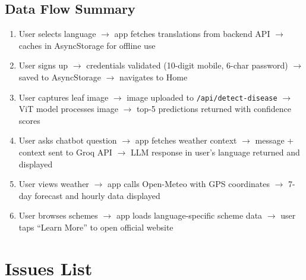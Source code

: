 \documentclass[12pt,a4paper]{article}
\begin{document}
\subsection{Data Flow Summary}
\begin{enumerate}
    \item User selects language $\rightarrow$ app fetches translations from backend API $\rightarrow$ caches in AsyncStorage for offline use
    \item User signs up $\rightarrow$ credentials validated (10-digit mobile, 6-char password) $\rightarrow$ saved to AsyncStorage $\rightarrow$ navigates to Home
    \item User captures leaf image $\rightarrow$ image uploaded to \texttt{/api/detect-disease} $\rightarrow$ ViT model processes image $\rightarrow$ top-5 predictions returned with confidence scores
    \item User asks chatbot question $\rightarrow$ app fetches weather context $\rightarrow$ message + context sent to Groq API $\rightarrow$ LLM response in user's language returned and displayed
    \item User views weather $\rightarrow$ app calls Open-Meteo with GPS coordinates $\rightarrow$ 7-day forecast and hourly data displayed
    \item User browses schemes $\rightarrow$ app loads language-specific scheme data $\rightarrow$ user taps ``Learn More'' to open official website
\end{enumerate}

\section{Issues List}
\end{document}
